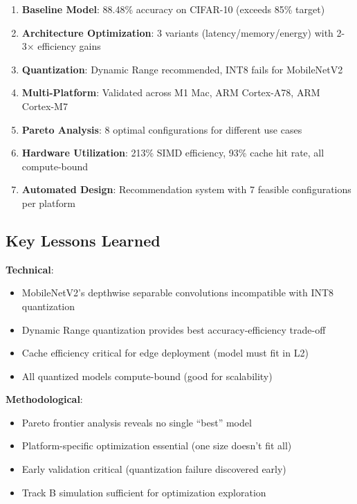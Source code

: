 \documentclass[10pt, a4paper]{article}
\begin{document}
\begin{enumerate}
    \item \textbf{Baseline Model}: 88.48\% accuracy on CIFAR-10 (exceeds 85\% target)
    \item \textbf{Architecture Optimization}: 3 variants (latency/memory/energy) with 2-3× efficiency gains
    \item \textbf{Quantization}: Dynamic Range recommended, INT8 fails for MobileNetV2
    \item \textbf{Multi-Platform}: Validated across M1 Mac, ARM Cortex-A78, ARM Cortex-M7
    \item \textbf{Pareto Analysis}: 8 optimal configurations for different use cases
    \item \textbf{Hardware Utilization}: 213\% SIMD efficiency, 93\% cache hit rate, all compute-bound
    \item \textbf{Automated Design}: Recommendation system with 7 feasible configurations per platform
\end{enumerate}

\subsection{Key Lessons Learned}

\textbf{Technical}:
\begin{itemize}
    \item MobileNetV2's depthwise separable convolutions incompatible with INT8 quantization
    \item Dynamic Range quantization provides best accuracy-efficiency trade-off
    \item Cache efficiency critical for edge deployment (model must fit in L2)
    \item All quantized models compute-bound (good for scalability)
\end{itemize}

\textbf{Methodological}:
\begin{itemize}
    \item Pareto frontier analysis reveals no single ``best'' model
    \item Platform-specific optimization essential (one size doesn't fit all)
    \item Early validation critical (quantization failure discovered early)
    \item Track B simulation sufficient for optimization exploration
\end{itemize}
\end{document}
